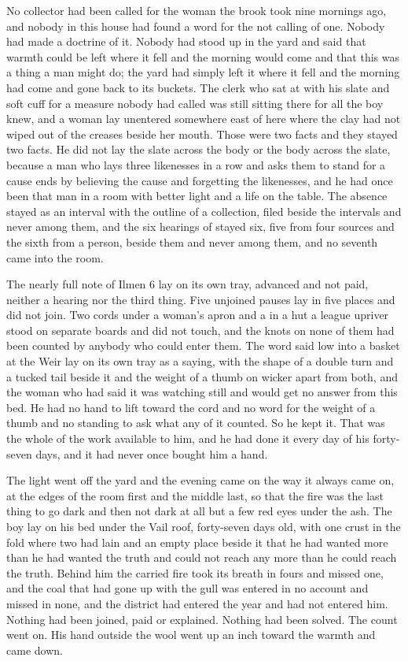 No collector had been called for the woman the brook took nine mornings ago, and nobody in this house had found a word for the not calling of one. Nobody had made a doctrine of it. Nobody had stood up in the yard and said that warmth could be left where it fell and the morning would come and that this was a thing a man might do; the yard had simply left it where it fell and the morning had come and gone back to its buckets. The clerk who sat at  with his slate and soft cuff for a measure nobody had called was still sitting there for all the boy knew, and a woman lay unentered somewhere east of here where the clay had not wiped out of the creases beside her mouth. Those were two facts and they stayed two facts. He did not lay the slate across the body or the body across the slate, because a man who lays three likenesses in a row and asks them to stand for a cause ends by believing the cause and forgetting the likenesses, and he had once been that man in a room with better light and a life on the table. The absence stayed as an interval with the outline of a collection, filed beside the intervals and never among them, and the six hearings of  stayed six, five from four sources and the sixth from a person, beside them and never among them, and no seventh came into the room.

The nearly full note of Ilmen 6 lay on its own tray, advanced and not paid, neither a hearing nor the third thing. Five unjoined pauses lay in five places and did not join. Two cords under a woman's apron and a  in a hut a league upriver stood on separate boards and did not touch, and the knots on none of them had been counted by anybody who could enter them. The word said low into a basket at the Weir lay on its own tray as a saying, with the shape of a double turn and a tucked tail beside it and the weight of a thumb on wicker apart from both, and the woman who had said it was watching still and would get no answer from this bed. He had no hand to lift toward the cord and no word for the weight of a thumb and no standing to ask what any of it counted. So he kept it. That was the whole of the work available to him, and he had done it every day of his forty-seven days, and it had never once bought him a hand.

The light went off the yard and the evening came on the way it always came on, at the edges of the room first and the middle last, so that the fire was the last thing to go dark and then not dark at all but a few red eyes under the ash. The boy lay on his bed under the Vail roof, forty-seven days old, with one crust in the fold where two had lain and an empty place beside it that he had wanted more than he had wanted the truth and could not reach any more than he could reach the truth. Behind him the carried fire took its breath in fours and missed one, and the coal that had gone up with the gull was entered in no account and missed in none, and the district had entered the year and had not entered him. Nothing had been joined, paid or explained. Nothing had been solved. The count went on. His hand outside the wool went up an inch toward the warmth and came down.
